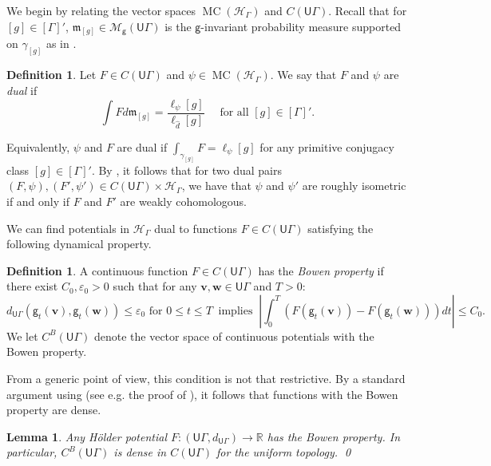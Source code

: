 \documentclass[twoside]{amsart}
\newtheorem{lemma}[theorem]{Lemma}
\theoremstyle{definition}
\newtheorem{definition}[theorem]{Definition}
\numberwithin{equation}{section}
\numberwithin{theorem}{section}
\newcommand{\msf}[1]{\mathsf{#1}}
\newcommand{\R}{\mathbb{R}}
\newcommand{\calH}{\mathcal{H}}
\newcommand{\calM}{\mathcal{M}}
\newcommand{\frakm}{\mathfrak{m}}
\newcommand{\G}{\Gamma}
\newcommand{\gam}{\gamma}
\newcommand{\ep}{\epsilon}
\renewcommand{\epsilon}{\varepsilon}
\newcommand{\p}{\psi}
\newcommand{\ra}{\rightarrow}
\newcommand{\vv}{\mathbf{v}}
\newcommand{\vw}{\mathbf{w}}
\newcommand{\UG}{\msf{U}\G}
\DeclareMathOperator{\MC}{MC}
\begin{document}
We begin by relating the vector spaces $\MC(\calH_\G)$ and $C(\msf{U}\G)$. Recall that for $[g]\in [\G]'$, $\frakm_{[g]}\in \calM_{\msf{g}}(\UG)$ is the $\msf{g}$-invariant probability measure supported on $\gam_{[g]}$ as in .

\begin{definition}\label{def:dualC-H}
    Let $F\in C(\msf{U}\G)$ and $\psi\in \MC(\calH_\G)$. We say that $F$ and $\psi$ are \emph{dual} if
\begin{equation}\label{eq:def.dualC-H}
    \int{F}{d\frakm_{[g]}}=\frac{\ell_{\psi}[g]}{\ell_{\hat d}[g]}  \quad \text{ for all } [g]\in [\G]'.
    \end{equation}
\end{definition}
Equivalently, $\p$ and $F$ are dual if $\int_{\gam_{[g]}}F=\ell_{\p}[g]$ for any primitive conjugacy class $[g]\in [\G]'$. By \cite[Corollary~3.5]{CRS}, it follows that for two dual pairs $(F,\p), (F',\p')\in C(\UG)\times \calH_\G$, we have that $\p$ and $\p'$ are roughly isometric if and only if $F$ and $F'$ are weakly cohomologous.

We can find potentials in $\calH_\G$ dual to functions $F\in C(\UG)$ satisfying the following dynamical property.

\begin{definition}\label{def:bowen}
    A continuous function $F\in C(\UG)$ has the \emph{Bowen property} if there exist $C_0,\ep_0>0$ such that for any $\vv,\vw\in \UG$ and $T>0$:
    \begin{equation*}
        d_{\UG}(\msf{g}_t(\vv),\msf{g}_t(\vw)) \leq \ep_0 \text{ for }0\leq t \leq T \ \text{ implies } \ \left|\int_{0}^{T}{(F(\msf{g}_t(\vv))-F(\msf{g}_t(\vw)))}{dt}\right|\leq C_0. 
    \end{equation*}
We let $C^B(\UG)$ denote the vector space of continuous potentials with the Bowen property.
\end{definition}

From a generic point of view, this condition is not that restrictive. By a standard argument using  (see e.g. the proof of \cite[Proposition~4.3]{CLT.weak}), it follows that functions with the Bowen property are dense.

\begin{lemma}\label{lem:bowendense}
Any H\"older potential $F:(\UG,d_{\UG})\ra \R$ has the Bowen property. In particular, $C^B(\UG)$ is dense in $C(\UG)$ for the uniform topology. \qed
\end{lemma}
\end{document}
